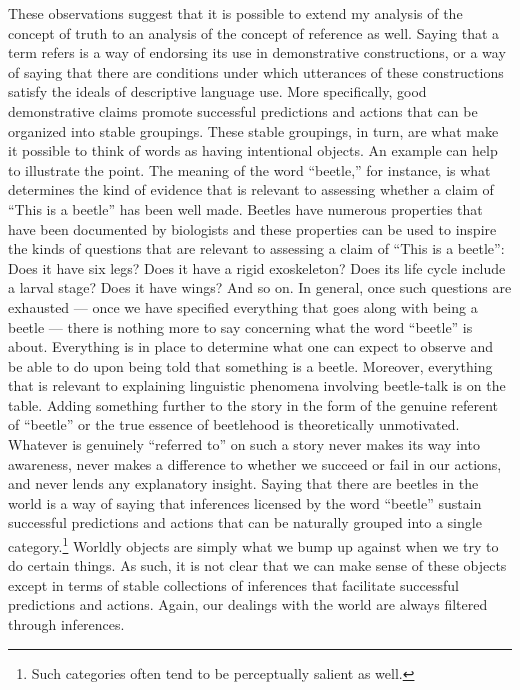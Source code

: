 These observations suggest that it is possible to extend my analysis of the concept of truth to an analysis of the concept of reference as well. Saying that a term refers is a way of endorsing its use in demonstrative constructions, or a way of saying that there are conditions under which utterances of these constructions satisfy the ideals of descriptive language use. More specifically, good demonstrative claims promote successful predictions and actions that can be organized into stable groupings. These stable groupings, in turn, are what make it possible to think of words as having intentional objects. An example can help to illustrate the point. The meaning of the word ``beetle,'' for instance, is what determines the kind of evidence that is relevant to assessing whether a claim of ``This is a beetle'' has been well made. Beetles have numerous properties that have been documented by biologists and these properties can be used to inspire the kinds of questions that are relevant to assessing a claim of ``This is a beetle'': Does it have six legs? Does it have a rigid exoskeleton? Does its life cycle include a larval stage? Does it have wings? And so on. In general, once such questions are exhausted --- once we have specified everything that goes along with being a beetle --- there is nothing more to say concerning what the word ``beetle'' is about. Everything is in place to determine what one can expect to observe and be able to do upon being told that something is a beetle. Moreover, everything that is relevant to explaining linguistic phenomena involving beetle-talk is on the table. Adding something further to the story in the form of the genuine referent of ``beetle'' or the true essence of beetlehood is theoretically unmotivated. Whatever is genuinely ``referred to'' on such a story never makes its way into awareness, never makes a difference to whether we succeed or fail in our actions, and never lends any explanatory insight. Saying that there are beetles in the world is a way of saying that inferences licensed by the word ``beetle'' sustain successful predictions and actions that can be naturally grouped into a single category.\footnote{Such categories often tend to be perceptually salient as well.} Worldly objects are simply what we bump up against when we try to do certain things. As such, it is not clear that we can make sense of these objects except in terms of stable collections of inferences that facilitate successful predictions and actions. Again, our dealings with the world are always filtered through inferences. 

